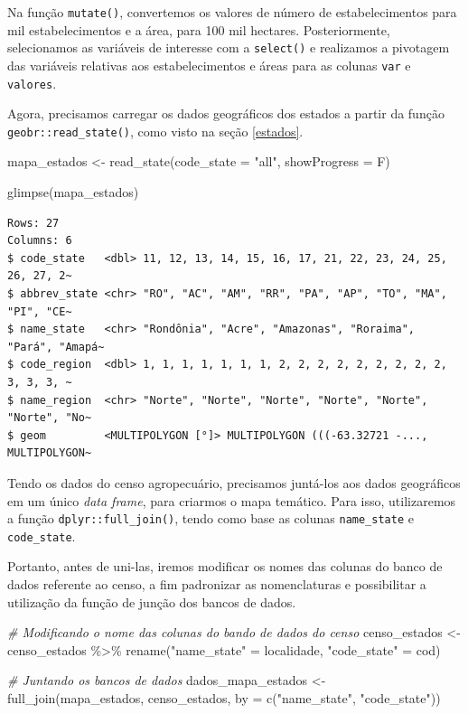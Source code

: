 \documentclass[
  brazilian,
]{book}
\newenvironment{Shaded}{\begin{snugshade}}{\end{snugshade}}
\newcommand{\AttributeTok}[1]{\textcolor[rgb]{0.77,0.63,0.00}{#1}}
\newcommand{\CommentTok}[1]{\textcolor[rgb]{0.56,0.35,0.01}{\textit{#1}}}
\newcommand{\FunctionTok}[1]{\textcolor[rgb]{0.00,0.00,0.00}{#1}}
\newcommand{\NormalTok}[1]{#1}
\newcommand{\OtherTok}[1]{\textcolor[rgb]{0.56,0.35,0.01}{#1}}
\newcommand{\SpecialCharTok}[1]{\textcolor[rgb]{0.00,0.00,0.00}{#1}}
\newcommand{\StringTok}[1]{\textcolor[rgb]{0.31,0.60,0.02}{#1}}
\begin{document}
Na função \texttt{mutate()}, convertemos os valores de número de estabelecimentos para mil estabelecimentos e a área, para 100 mil hectares. Posteriormente, selecionamos as variáveis de interesse com a \texttt{select()} e realizamos a pivotagem das variáveis relativas aos estabelecimentos e áreas para as colunas \texttt{var} e \texttt{valores}.

Agora, precisamos carregar os dados geográficos dos estados a partir da função \texttt{geobr::read\_state()}, como visto na seção \ref{estados}.

\begin{Shaded}
\begin{Highlighting}[]
\NormalTok{mapa\_estados }\OtherTok{\textless{}{-}} \FunctionTok{read\_state}\NormalTok{(}\AttributeTok{code\_state =} \StringTok{"all"}\NormalTok{, }\AttributeTok{showProgress =}\NormalTok{ F)}

\FunctionTok{glimpse}\NormalTok{(mapa\_estados)}
\end{Highlighting}
\end{Shaded}

\begin{verbatim}
Rows: 27
Columns: 6
$ code_state   <dbl> 11, 12, 13, 14, 15, 16, 17, 21, 22, 23, 24, 25, 26, 27, 2~
$ abbrev_state <chr> "RO", "AC", "AM", "RR", "PA", "AP", "TO", "MA", "PI", "CE~
$ name_state   <chr> "Rondônia", "Acre", "Amazonas", "Roraima", "Pará", "Amapá~
$ code_region  <dbl> 1, 1, 1, 1, 1, 1, 1, 2, 2, 2, 2, 2, 2, 2, 2, 2, 3, 3, 3, ~
$ name_region  <chr> "Norte", "Norte", "Norte", "Norte", "Norte", "Norte", "No~
$ geom         <MULTIPOLYGON [°]> MULTIPOLYGON (((-63.32721 -..., MULTIPOLYGON~
\end{verbatim}

Tendo os dados do censo agropecuário, precisamos juntá-los aos dados geográficos em um único \emph{data frame}, para criarmos o mapa temático. Para isso, utilizaremos a função \texttt{dplyr::full\_join()}, tendo como base as colunas \texttt{name\_state} e \texttt{code\_state}.

Portanto, antes de uni-las, iremos modificar os nomes das colunas do banco de dados referente ao censo, a fim padronizar as nomenclaturas e possibilitar a utilização da função de junção dos bancos de dados.

\begin{Shaded}
\begin{Highlighting}[]
\CommentTok{\# Modificando o nome das colunas do bando de dados do censo}
\NormalTok{censo\_estados }\OtherTok{\textless{}{-}}\NormalTok{ censo\_estados }\SpecialCharTok{\%\textgreater{}\%}
  \FunctionTok{rename}\NormalTok{(}\StringTok{"name\_state"} \OtherTok{=}\NormalTok{ localidade,}
         \StringTok{"code\_state"} \OtherTok{=}\NormalTok{ cod)}

\CommentTok{\# Juntando os bancos de dados}
\NormalTok{dados\_mapa\_estados }\OtherTok{\textless{}{-}} \FunctionTok{full\_join}\NormalTok{(mapa\_estados, censo\_estados, }\AttributeTok{by =} \FunctionTok{c}\NormalTok{(}\StringTok{"name\_state"}\NormalTok{, }\StringTok{"code\_state"}\NormalTok{))}
\end{Highlighting}
\end{Shaded}
\end{document}
